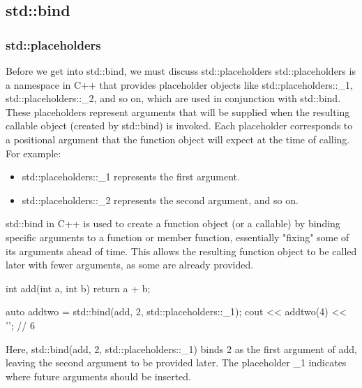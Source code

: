 \documentclass{report}
\begin{document}
    \pagebreak 
    \bigbreak \noindent 
    \subsection{std::bind}
    \bigbreak \noindent 
    \subsubsection{std::placeholders}
    \bigbreak \noindent 
    Before we get into std::bind, we must discuss std::placeholders
    \bigbreak \noindent 
    std::placeholders is a namespace in C++ that provides placeholder objects like std::placeholders::\_1, std::placeholders::\_2, and so on, which are used in conjunction with std::bind. These placeholders represent arguments that will be supplied when the resulting callable object (created by std::bind) is invoked.
    \bigbreak \noindent 
    Each placeholder corresponds to a positional argument that the function object will expect at the time of calling. For example:
    \begin{itemize}
        \item std::placeholders::\_1 represents the first argument.
        \item std::placeholders::\_2 represents the second argument, and so on.
    \end{itemize}

    \bigbreak \noindent 
    std::bind in C++ is used to create a function object (or a callable) by binding specific arguments to a function or member function, essentially "fixing" some of its arguments ahead of time. This allows the resulting function object to be called later with fewer arguments, as some are already provided.
    \bigbreak \noindent 
    \begin{cppcode}
        int add(int a, int b) {
            return a + b;
        }

        auto addtwo = std::bind(add, 2, std::placeholders::_1);
        cout << addtwo(4) << '\n'; // 6
    \end{cppcode}
    \bigbreak \noindent 
    Here, std::bind(add, 2, std::placeholders::\_1) binds 2 as the first argument of add, leaving the second argument to be provided later. The placeholder \_1 indicates where future arguments should be inserted.

    \pagebreak 
\end{document}
